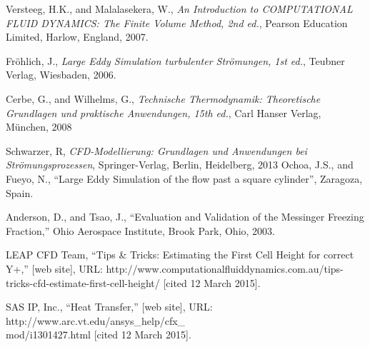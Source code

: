 Versteeg, H.K., and Malalasekera, W., \emph{An Introduction to COMPUTATIONAL FLUID DYNAMICS: The Finite Volume Method, 2nd ed.}, Pearson Education Limited, Harlow, England, 2007.

Fröhlich, J., \emph{Large Eddy Simulation turbulenter Strömungen, 1st ed.}, Teubner Verlag, Wiesbaden, 2006.

Cerbe, G., and Wilhelms, G., \emph{Technische Thermodynamik: Theoretische Grundlagen und praktische Anwendungen, 15th ed.}, Carl Hanser Verlag, München, 2008

Schwarzer, R, \emph{CFD-Modellierung: Grundlagen und Anwendungen bei Strömungsprozessen}, Springer-Verlag, Berlin, Heidelberg, 2013
Ochoa, J.S., and Fueyo, N., “Large Eddy Simulation of the flow past a square cylinder”, Zaragoza, Spain.

Anderson, D., and Tsao, J., ``Evaluation and Validation of the Messinger Freezing Fraction,'' Ohio Aerospace Institute, Brook Park, Ohio, 2003.

LEAP CFD Team, ``Tips \& Tricks: Estimating the First Cell Height for correct Y+,'' [web site], URL: http://www.computationalfluiddynamics.com.au/tips-tricks-cfd-estimate-first-cell-height/ [cited 12 March 2015].

SAS IP, Inc., ``Heat Transfer,'' [web site], URL: http://www.arc.vt.edu/ansys\_help/cfx\_\\mod/i1301427.html [cited 12 March 2015].